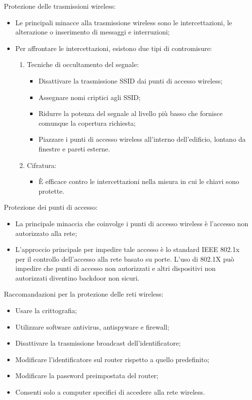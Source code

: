 Protezione delle trasmissioni wireless:
\begin{itemize}
    \item Le principali minacce alla trasmissione wireless sono le intercettazioni, le alterazione o inserimento di messaggi e interruzioni;
	\item Per affrontare le intercettazioni, esistono due tipi di contromisure:
	\begin{enumerate}
	    \item Tecniche di occultamento del segnale:
		\begin{itemize}
		    \item Disattivare la trasmissione SSID dai punti di accesso wireless;
			\item Assegnare nomi criptici agli SSID;
			\item Ridurre la potenza del segnale al livello più basso che fornisce comunque la copertura richiesta;
			\item Piazzare i punti di accesso wireless all'interno dell'edificio, lontano da finestre e pareti esterne.
		\end{itemize}
		\item Cifratura:
		\begin{itemize}
		    \item È efficace contro le intercettazioni nella misura in cui le chiavi sono protette.
		\end{itemize}
	\end{enumerate}
\end{itemize}

Protezione dei punti di accesso:
\begin{itemize}
    \item La principale minaccia che coinvolge i punti di accesso wireless è l'accesso non autorizzato alla rete;
	\item L'approccio principale per impedire tale accesso è lo standard IEEE 802.1x per il controllo dell'accesso alla rete basato su porte. L'uso di 802.1X può impedire che punti di accesso non autorizzati e altri dispositivi non autorizzati diventino backdoor non sicuri.
\end{itemize}

Raccomandazioni per la protezione delle reti wireless:
\begin{itemize}
    \item Usare la crittografia;
	\item Utilizzare software antivirus, antispyware e firewall;
	\item Disattivare la trasmissione broadcast dell'identificatore;
	\item Modificare l'identificatore sul router rispetto a quello predefinito;
	\item Modificare la password preimpostata del router;
	\item Consenti solo a computer specifici di accedere alla rete wireless.
\end{itemize}

